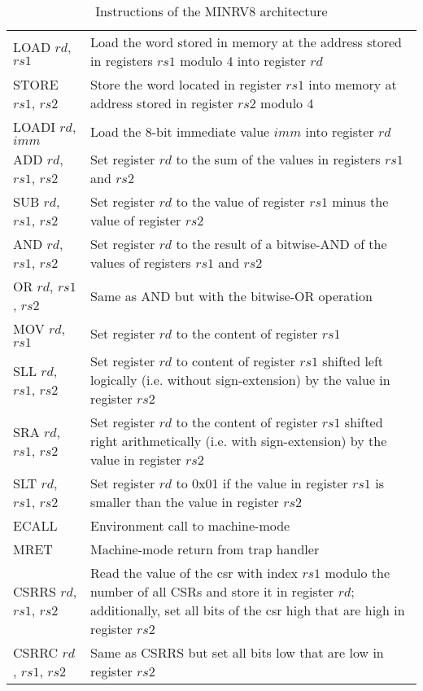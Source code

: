 \begin{table}
    \centering
    \begin{tabular}{|l p{10cm}|}
        \hline
        LOAD $ rd $, $ rs1 $ & Load the word stored in memory at the address stored in registers $ rs1 $ modulo 4 into register $ rd $ \\
        STORE $ rs1 $, $ rs2 $ & Store the word located in register $ rs1 $ into memory at address stored in register $ rs2 $ modulo 4 \\
        LOADI $ rd $, $ imm $ & Load the 8-bit immediate value $ imm $ into register $ rd $ \\
        ADD $ rd $, $ rs1 $, $ rs2 $ & Set register $ rd $ to the sum of the values in registers $ rs1 $ and $ rs2 $ \\
        SUB $ rd $, $ rs1 $, $ rs2 $ & Set register $ rd $ to the value of register $ rs1 $ minus the value of register $ rs2 $ \\
        AND $ rd $, $ rs1 $, $ rs2 $ & Set register $ rd $ to the result of a bitwise-AND of the values of registers $ rs1 $ and $ rs2 $ \\
        OR $ rd $, $ rs1 $, $ rs2 $ & Same as AND but with the bitwise-OR operation \\
        MOV $ rd $, $ rs1 $ & Set register $ rd $ to the content of register $ rs1 $ \\
        SLL $ rd $, $ rs1 $, $ rs2 $ & Set register $ rd $ to content of register $ rs1 $ shifted left logically (i.e. without sign-extension) by the value in register $ rs2 $ \\
        SRA $ rd $, $ rs1 $, $ rs2 $ & Set register $ rd $ to the content of register $ rs1 $ shifted right arithmetically (i.e. with sign-extension) by the value in register $ rs2 $ \\
        SLT $ rd $, $ rs1 $, $ rs2 $ & Set register $ rd $ to 0x01 if the value in register $ rs1 $ is smaller than the value in register $ rs2 $ \\
        ECALL & Environment call to machine-mode \\
        MRET & Machine-mode return from trap handler \\
        CSRRS $ rd $, $ rs1 $, $ rs2 $ & Read the value of the \gls{csr} with index $ rs1 $ modulo the number of all CSRs and store it in register $ rd $; additionally, set all bits of the \gls{csr} high that are high in register $ rs2 $ \\
        CSRRC $ rd $, $ rs1 $, $ rs2 $ & Same as CSRRS but set all bits low that are low in register $ rs2 $ \\
        \hline
    \end{tabular}
    \caption{Instructions of the MINRV8 architecture}
    \label{tbl:min-arch-instrs}
\end{table}

